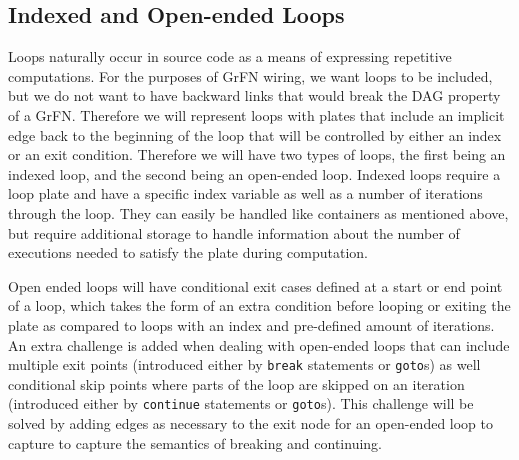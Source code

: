 \subsection{Indexed and Open-ended Loops\label{sec:loops}}
Loops naturally occur in source code as a means of expressing repetitive computations.
For the purposes of GrFN wiring, we want loops to be included, but we do not want to have backward links that would break the DAG property of a GrFN.
Therefore we will represent loops with plates that include an implicit edge back to the beginning of the loop that will be controlled by either an index or an exit condition. Therefore we will have two types of loops, the first being an indexed loop, and the second being an open-ended loop.
Indexed loops require a loop plate and have a specific index variable as well as a number of iterations through the loop.
They can easily be handled like containers as mentioned above, but require additional storage to handle information about the number of executions needed to satisfy the plate during computation.

Open ended loops will have conditional exit cases defined at a start or end point of a loop, which takes the form of an extra condition before looping or exiting the plate as compared to loops with an index and pre-defined amount of iterations.
An extra challenge is added when dealing with open-ended loops that can include multiple exit points (introduced either by \texttt{break} statements or \texttt{goto}s) as well conditional skip points where parts of the loop are skipped on an iteration (introduced either by \texttt{continue} statements or \texttt{goto}s).
This challenge will be solved by adding edges as necessary to the exit node for an open-ended loop to capture to capture the semantics of breaking and continuing.

